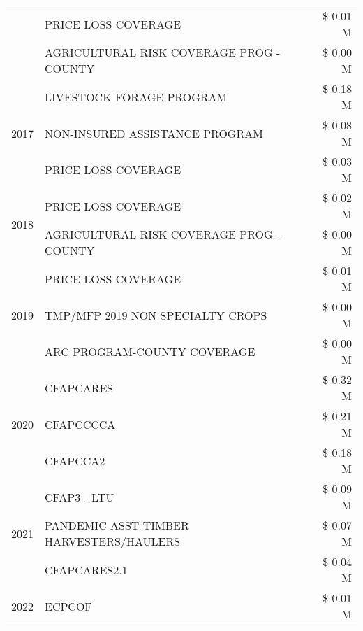 \begin{tabular}{llr}
 & PRICE LOSS COVERAGE & \$ 0.01 M \\
 & AGRICULTURAL RISK COVERAGE PROG - COUNTY & \$ 0.00 M \\
\cline{1-3}
\multirow[t]{3}{*}{2017} & LIVESTOCK FORAGE PROGRAM & \$ 0.18 M \\
 & NON-INSURED ASSISTANCE PROGRAM & \$ 0.08 M \\
 & PRICE LOSS COVERAGE & \$ 0.03 M \\
\cline{1-3}
\multirow[t]{2}{*}{2018} & PRICE LOSS COVERAGE & \$ 0.02 M \\
 & AGRICULTURAL RISK COVERAGE PROG - COUNTY & \$ 0.00 M \\
\cline{1-3}
\multirow[t]{3}{*}{2019} & PRICE LOSS COVERAGE & \$ 0.01 M \\
 & TMP/MFP 2019 NON SPECIALTY CROPS & \$ 0.00 M \\
 & ARC PROGRAM-COUNTY COVERAGE & \$ 0.00 M \\
\cline{1-3}
\multirow[t]{3}{*}{2020} & CFAPCARES & \$ 0.32 M \\
 & CFAPCCCCA & \$ 0.21 M \\
 & CFAPCCA2 & \$ 0.18 M \\
\cline{1-3}
\multirow[t]{3}{*}{2021} & CFAP3 - LTU & \$ 0.09 M \\
 & PANDEMIC ASST-TIMBER HARVESTERS/HAULERS & \$ 0.07 M \\
 & CFAPCARES2.1 & \$ 0.04 M \\
\cline{1-3}
2022 & ECPCOF & \$ 0.01 M \\
\cline{1-3}
\bottomrule
\end{tabular}
